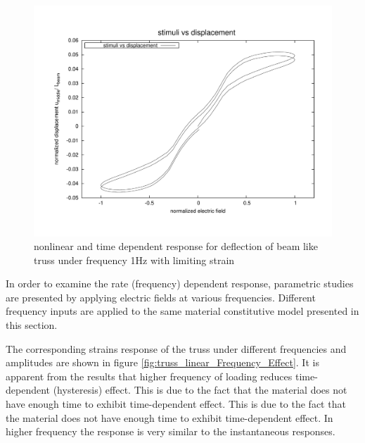 \begin{figure}  
\centering
\includegraphics[width=5.0in]{./chap_5_active_trusses/images_non_linear_time_dependent_constitutive_equatio/limiting_strain_linear_tetrahedral_time_dependent_efield_vs_displacement_nonlinear.pdf}
\caption{nonlinear and time dependent response for deflection of beam like truss under frequency 1Hz with limiting strain}
\label{fig:limiting_strain_linear_tetrahedral_time_dependent_efield_vs_displacement_nonlinear}
\end{figure} 

In order to examine the rate (frequency) dependent response, parametric studies are presented by applying electric fields at various frequencies. 
Different frequency inputs are applied to the same material constitutive model presented in this section. 

The corresponding strains response of the truss under different frequencies and amplitudes are shown in figure \ref{fig:truss_linear_Frequency_Effect}. 
It is apparent from the results that higher frequency of loading reduces time-dependent (hysteresis) effect. 
This is due to the fact that the material does not have enough time to exhibit time-dependent effect. 
This is due to the fact that the material does not have enough time to exhibit time-dependent effect. In higher frequency the response is very similar to the instantaneous responses.  

